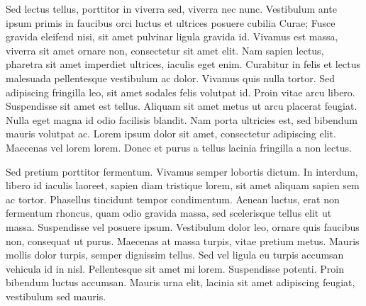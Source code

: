 Sed lectus tellus, porttitor in viverra sed, viverra nec
nunc. Vestibulum ante ipsum primis in faucibus orci luctus et ultrices
posuere cubilia Curae; Fusce gravida eleifend nisi, sit amet pulvinar
ligula gravida id. Vivamus est massa, viverra sit amet ornare non,
consectetur sit amet elit. Nam sapien lectus, pharetra sit amet
imperdiet ultrices, iaculis eget enim. Curabitur in felis et lectus
malesuada pellentesque vestibulum ac dolor. Vivamus quis nulla
tortor. Sed adipiscing fringilla leo, sit amet sodales felis volutpat
id. Proin vitae arcu libero. Suspendisse sit amet est tellus. Aliquam
sit amet metus ut arcu placerat feugiat. Nulla eget magna id odio
facilisis blandit. Nam porta ultricies est, sed bibendum mauris
volutpat ac. Lorem ipsum dolor sit amet, consectetur adipiscing
elit. Maecenas vel lorem lorem. Donec et purus a tellus lacinia
fringilla a non lectus.

Sed pretium porttitor fermentum. Vivamus semper lobortis dictum. In
interdum, libero id iaculis laoreet, sapien diam tristique lorem, sit
amet aliquam sapien sem ac tortor. Phasellus tincidunt tempor
condimentum. Aenean luctus, erat non fermentum rhoncus, quam odio
gravida massa, sed scelerisque tellus elit ut massa. Suspendisse vel
posuere ipsum. Vestibulum dolor leo, ornare quis faucibus non,
consequat ut purus. Maecenas at massa turpis, vitae pretium
metus. Mauris mollis dolor turpis, semper dignissim tellus. Sed vel
ligula eu turpis accumsan vehicula id in nisl. Pellentesque sit amet
mi lorem. Suspendisse potenti. Proin bibendum luctus accumsan. Mauris
urna elit, lacinia sit amet adipiscing feugiat, vestibulum sed mauris.

